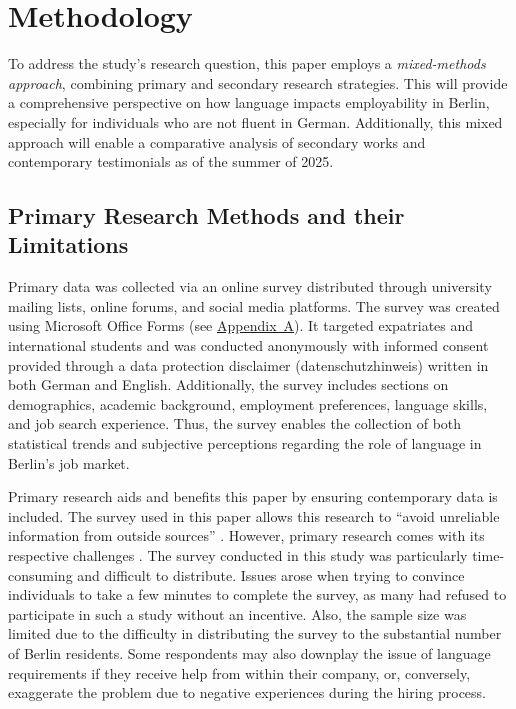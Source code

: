 \chapter{Methodology}
To address the study’s research question, this paper employs a \emph{mixed-methods approach}, combining primary and secondary research strategies. This will provide a comprehensive perspective on how language impacts employability in Berlin, especially for individuals who are not fluent in German. Additionally, this mixed approach will enable a comparative analysis of secondary works and contemporary testimonials as of the summer of 2025.

\section{Primary Research Methods and their Limitations}
Primary data was collected via an online survey distributed through university mailing lists, online forums, and social media platforms. The survey was created using Microsoft Office Forms (see \hyperref[appendix:A]{Appendix~A}). It targeted expatriates and international students and was conducted anonymously with informed consent provided through a data protection disclaimer (datenschutzhinweis) written in both German and English. Additionally, the survey includes sections on demographics, academic background, employment preferences, language skills, and job search experience. Thus, the survey enables the collection of both statistical trends and subjective perceptions regarding the role of language in Berlin’s job market.

Primary research aids and benefits this paper by ensuring contemporary data is included. The survey used in this paper allows this research to “avoid unreliable information from outside sources” \citep{Indeed25}. However, primary research comes with its respective challenges \citep{k2024crucial}. The survey conducted in this study was particularly time-consuming and difficult to distribute. Issues arose when trying to convince individuals to take a few minutes to complete the survey, as many had refused to participate in such a study without an incentive. Also, the sample size was limited due to the difficulty in distributing the survey to the substantial number of Berlin residents. Some respondents may also downplay the issue of language requirements if they receive help from within their company, or, conversely, exaggerate the problem due to negative experiences during the hiring process.

